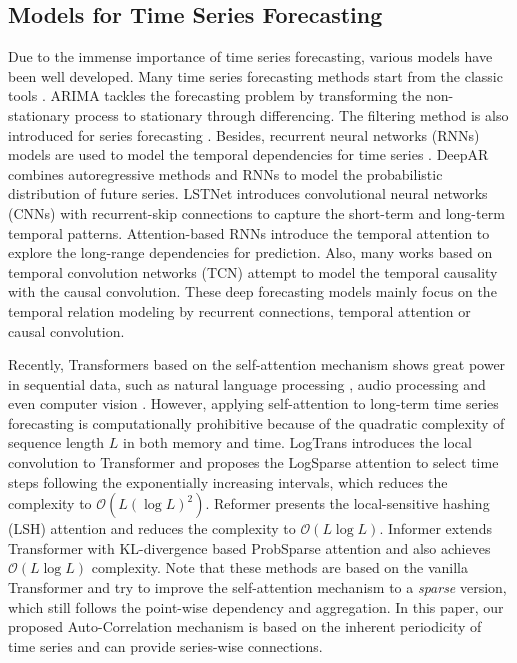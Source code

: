 \subsection{Models for Time Series Forecasting}
Due to the immense importance of time series forecasting, various models have been well developed.
Many time series forecasting methods start from the classic tools \cite{Sorjamaa2007MethodologyFL,chen2021data}. ARIMA \cite{Box1968SomeRA,Box1970TimeSA} tackles the forecasting problem by transforming the non-stationary process to stationary through differencing. The filtering method is also introduced for series forecasting \cite{Kurle2020DeepRP,Bzenac2020NormalizingKF}.
Besides, recurrent neural networks (RNNs) models are used to model the temporal dependencies for time series \cite{Wen2017AMQ,Rangapuram2018DeepSS,2017Long,Maddix2018DeepFW}. DeepAR \cite{Flunkert2017DeepARPF} combines autoregressive methods and RNNs to model the probabilistic distribution of future series. 
LSTNet \cite{2018Modeling} introduces convolutional neural networks (CNNs) with recurrent-skip connections to capture the short-term and long-term temporal patterns. Attention-based RNNs \cite{2017A,Shih2019TemporalPA,Song2018AttendAD} introduce the temporal attention to explore the long-range dependencies for prediction.
Also, many works based on temporal convolution networks (TCN) \cite{Oord2016WaveNetAG,2017Conditional,Bai2018AnEE,Sen2019ThinkGA} attempt to model the temporal causality with the causal convolution.
These deep forecasting models mainly focus on the temporal relation modeling by recurrent connections, temporal attention or causal convolution. 

Recently, Transformers \cite{NIPS2017_3f5ee243,Wu2020AdversarialST} based on the self-attention mechanism shows great power in sequential data, such as natural language processing \cite{Devlin2019BERTPO,NEURIPS2020_1457c0d6}, audio processing \cite{huang2018music} and even computer vision \cite{dosovitskiy2021an,liu2021Swin}. However, applying self-attention to long-term time series forecasting is computationally prohibitive because of the quadratic complexity of sequence length $L$ in both memory and time. LogTrans \cite{2019Enhancing} introduces the local convolution to Transformer and proposes the LogSparse attention to select time steps following the exponentially increasing intervals, which reduces the complexity to $\mathcal{O}(L(\log L)^2)$. Reformer \cite{kitaev2020reformer} presents the local-sensitive hashing (LSH) attention and reduces the complexity to $\mathcal{O}(L\log L)$. Informer \cite{haoyietal-informer-2021} extends Transformer with KL-divergence based ProbSparse attention and also achieves $\mathcal{O}(L\log L)$ complexity. Note that these methods are based on the vanilla Transformer and try to improve the self-attention mechanism to a \emph{sparse} version, which still follows the point-wise dependency and aggregation. In this paper, our proposed Auto-Correlation mechanism is based on the inherent periodicity of time series and can provide series-wise connections.

